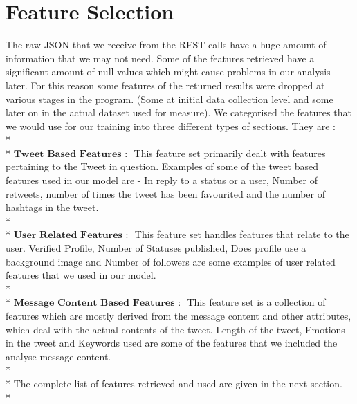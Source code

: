 \section{Feature Selection} 
The raw JSON that we receive from the REST calls have a huge amount of information that we may not need. Some of the features retrieved have a significant amount of null values which might cause problems in our analysis later. For this reason some features of the returned results were dropped at various stages in the program. (Some at initial data collection level and some later on in the actual dataset used for measure).
We categorised the features that we would use for our training into three different types of sections. They are : \\*\\*
$\textbf{Tweet Based Features : }$ This feature set primarily dealt with features pertaining to the Tweet in question. Examples of some of the tweet based features used in our model are - In reply to a status or a user, Number of retweets, number of times the tweet has been favourited and the number of hashtags in the tweet.  \\*\\*
$\textbf{User Related Features : }$ This feature set handles features that relate to the user.  Verified Profile, Number of Statuses published, Does profile use a background image and Number of followers are some examples of user related features that we used in our model. \\*\\*
$\textbf{Message Content Based Features : }$ This feature set is a collection of features which are mostly derived from the message content and other attributes, which deal with the actual contents of the tweet. Length of the tweet, Emotions in the tweet and Keywords used are some of the features that we included the analyse message content.\\*\\*
The complete list of features retrieved and used are given in the next section. \\*
